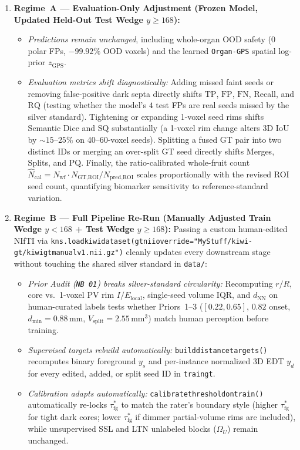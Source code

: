 \documentclass[10pt,a4paper]{article}
\renewcommand{\_}{\origunderscore\allowbreak}
\begin{document}
\begin{enumerate}
    \item \textbf{Regime~A --- Evaluation-Only Adjustment (Frozen Model, Updated Held-Out Test Wedge $y \ge 168$):}
    \begin{itemize}
        \item \emph{Predictions remain unchanged}, including whole-organ OOD safety ($0$ polar FPs, $-99.92\%$ OOD voxels) and the learned \texttt{Organ-GPS} spatial log-prior $z_{\text{GPS}}$.
        \item \emph{Evaluation metrics shift diagnostically:} Adding missed faint seeds or removing false-positive dark septa directly shifts $\text{TP}$, $\text{FP}$, $\text{FN}$, Recall, and $\text{RQ}$ (testing whether the model's $4$ test FPs are real seeds missed by the silver standard). Tightening or expanding 1-voxel seed rims shifts Semantic Dice and $\text{SQ}$ substantially (a 1-voxel rim change alters 3D IoU by $\sim 15\text{--}25\%$ on 40--60-voxel seeds). Splitting a fused GT pair into two distinct IDs or merging an over-split GT seed directly shifts Merges, Splits, and $\text{PQ}$. Finally, the ratio-calibrated whole-fruit count $\hat{N}_{\text{cal}} = N_{\text{wf}}\cdot N_{\text{GT,ROI}}/N_{\text{pred,ROI}}$ scales proportionally with the revised ROI seed count, quantifying biomarker sensitivity to reference-standard variation.
    \end{itemize}
    \item \textbf{Regime~B --- Full Pipeline Re-Run (Manually Adjusted Train Wedge $y < 168$ + Test Wedge $y \ge 168$):}
    Passing a custom human-edited NIfTI via \texttt{kns.load\_kiwi\_dataset(gt\_nii\_override=\allowbreak "MyStuff/\allowbreak kiwi-gt/\allowbreak kiwi\_gt\_manual\_v1.nii.gz")} cleanly updates every downstream stage without touching the shared silver standard in \texttt{data/}:
    \begin{itemize}
        \item \emph{Prior Audit (\texttt{NB 01}) breaks silver-standard circularity:} Recomputing $r/R$, core vs.\ 1-voxel PV rim $I/E_{\text{local}}$, single-seed volume IQR, and $d_{\text{NN}}$ on human-curated labels tests whether Priors~1--3 ($[0.22, 0.65]$, $0.82$ onset, $d_{\min} = 0.88\,\text{mm}$, $V_{\text{split}} = 2.55\,\text{mm}^3$) match human perception before training.
        \item \emph{Supervised targets rebuild automatically:} \texttt{build\_distance\_targets()} recomputes binary foreground $y_s$ and per-instance normalized 3D EDT $y_d$ for every edited, added, or split seed ID in \texttt{train\_gt}.
        \item \emph{Calibration adapts automatically:} \texttt{calibrate\_threshold\_on\_train()} automatically re-locks $\tau_{\text{fg}}^*$ to match the rater's boundary style (higher $\tau_{\text{fg}}^*$ for tight dark cores; lower $\tau_{\text{fg}}^*$ if dimmer partial-volume rims are included), while unsupervised SSL and LTN unlabeled blocks ($\Omega_U$) remain unchanged.
    \end{itemize}
\end{enumerate}
\end{document}
